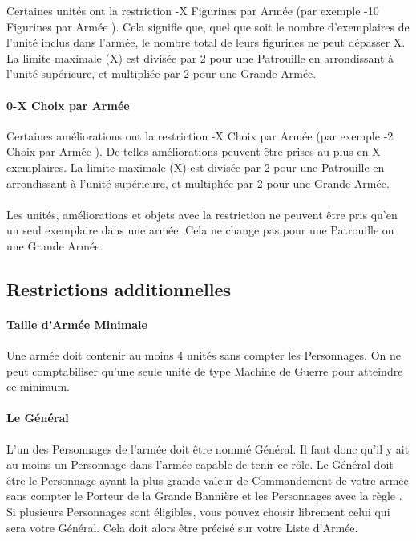 Certaines unités ont la restriction -X Figurines par Armée \fg{} (par exemple -10 Figurines par Armée \fg{}). Cela signifie que, quel que soit le nombre d'exemplaires de l'unité inclus dans l'armée, le nombre total de leurs figurines ne peut dépasser X. La limite maximale (X) est divisée par 2 pour une Patrouille en arrondissant à l'unité supérieure, et multipliée par 2 pour une Grande Armée.

\paragraph{0-X Choix par Armée}

Certaines améliorations ont la restriction -X Choix par Armée \fg{} (par exemple -2 Choix par Armée \fg{}). De telles améliorations peuvent être prises au plus en X exemplaires. La limite maximale (X) est divisée par 2 pour une Patrouille en arrondissant à l'unité supérieure, et multipliée par 2 pour une Grande Armée.

\paragraph{\oneperarmy}

Les unités, améliorations et objets avec la restriction \og \oneperarmy{} \fg{} ne peuvent être pris qu'en un seul exemplaire dans une armée. Cela ne change pas pour une Patrouille ou une Grande Armée.

\subsection{Restrictions additionnelles}

\paragraph{Taille d'Armée Minimale}

Une armée doit contenir au moins 4 unités sans compter les Personnages. On ne peut comptabiliser qu'une seule unité de type Machine de Guerre pour atteindre ce minimum.

\paragraph{Le Général}

L'un des Personnages de l'armée doit être nommé Général. Il faut donc qu'il y ait au moins un Personnage dans l'armée capable de tenir ce rôle. Le Général doit être le Personnage ayant la plus grande valeur de Commandement de votre armée sans compter le Porteur de la Grande Bannière et les Personnages avec la règle \notaleader{}. Si plusieurs Personnages sont éligibles, vous pouvez choisir librement celui qui sera votre Général. Cela doit alors être précisé sur votre Liste d'Armée.

